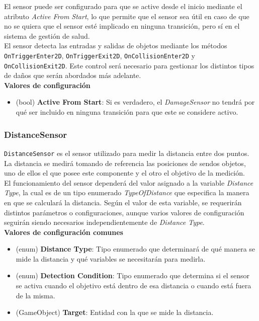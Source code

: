 El sensor puede ser configurado para que se active desde el inicio mediante el atributo \textit{Active From Start}, lo que permite que el sensor sea útil en caso de que no se quiera que el sensor esté implicado en ninguna transición, pero sí en el sistema de gestión de salud.\\

El sensor detecta las entradas y salidas de objetos mediante los métodos \texttt{OnTriggerEnter2D}, \texttt{OnTriggerExit2D}, \texttt{OnCollisionEnter2D} y \texttt{OnCollisionExit2D}. Este control será necesario para gestionar los distintos tipos de daños que serán abordados más adelante.\\

\textbf{Valores de configuración}
\begin{itemize}
	\item (bool)\textbf{ Active From Start}: Si es verdadero, el \textit{DamageSensor} no tendrá por qué ser incluido en ninguna transición para que este se considere activo.
\end{itemize}

\subsubsection{DistanceSensor}

\texttt{DistanceSensor} es el sensor utilizado para medir la distancia entre dos puntos. La distancia se medirá tomando de referencia las posiciones de sendos objetos, uno de ellos el que posee este componente y el otro el objetivo de la medición.\\

El funcionamiento del sensor dependerá del valor asignado a la variable \textit{Distance Type}, la cual es de un tipo enumerado \textit{TypeOfDistance} que especifica la manera en que se calculará la distancia. Según el valor de esta variable, se requerirán distintos parámetros o configuraciones, aunque varios valores de configuración seguirán siendo necesarios independientemente de \textit{Distance Type}.\\

\textbf{Valores de configuración comunes}
\begin{itemize}
	\item (enum) \textbf{Distance Type}: Tipo enumerado que determinará de qué manera se mide la distancia y qué variables se necesitarán para medirla.
	\item (enum) \textbf{Detection Condition}: Tipo enumerado que determina si el sensor se activa cuando el objetivo está dentro de esa distancia o cuando está fuera de la misma.
	\item (GameObject)\textbf{ Target}: Entidad con la que se mide la distancia.
\end{itemize}

